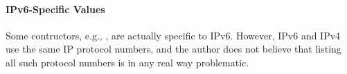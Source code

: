 \documentclass{report}
\begin{document}
\paragraph{IPv6-Specific Values}
Some  contructors, e.g., , are actually specific to IPv6.  However, IPv6 and IPv4 use the same IP protocol numbers, and the author does not believe that listing all such protocol numbers is in any real way problematic.
\end{document}
